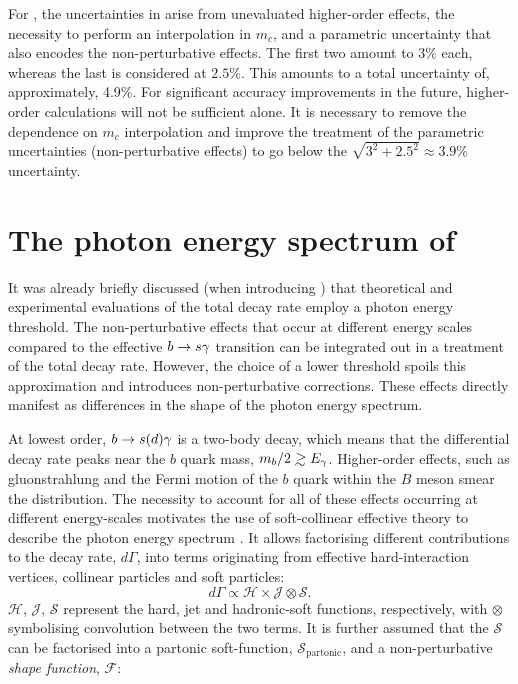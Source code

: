For \BtoXsgamma, the uncertainties in  arise from unevaluated higher-order effects, the necessity to perform an interpolation in $m_c$, and a parametric uncertainty that also encodes the non-perturbative effects.
The first two amount to $3\%$ each, whereas the last is considered at $2.5\%$. 
This amounts to a total uncertainty of, approximately, 4.9\%.
For significant accuracy improvements in the future, higher-order calculations will not be sufficient alone.
It is necessary to remove the dependence on $m_c$ interpolation and improve the treatment of the parametric uncertainties (non-perturbative effects) to go below the $\sqrt{3^2+2.5^2}\approx3.9\%$ uncertainty.

\section{The photon energy spectrum of \texorpdfstring{\BtoXsdgamma}{B->Xsg}}\label{sec:btosgamma_spectrum_theory}


It was already briefly discussed (when introducing ) that theoretical and experimental evaluations of the total \BtoXsgamma decay rate employ a photon energy threshold.
The non-perturbative effects that occur at different energy scales compared to the effective $b\rightarrow s\gamma$ transition can be integrated out in a treatment of the total decay rate.
However, the choice of a lower threshold spoils this approximation and introduces non-perturbative corrections.
These effects directly manifest as differences in the shape of the photon energy spectrum.

At lowest order, $b\rightarrow s(d) \gamma$ is a two-body decay, which means that the differential decay rate peaks near the $b$ quark mass, $m_b/2\gsim E_{\g}$.
Higher-order effects, such as gluonstrahlung and the Fermi motion of the $b$ quark within the $B$ meson smear the distribution.
The necessity to account for all of these effects occurring at different energy-scales motivates the use of soft-collinear effective theory to describe the \BtoXsgamma photon energy spectrum \cite{Neubert:2004qw,Ligeti:2008ac}.
It allows factorising different contributions to the decay rate, $d\Gamma$, into terms originating from effective hard-interaction vertices, collinear particles and soft particles:
\begin{equation}\label{eq:differential_decay_rate_SCET}
    d\Gamma \propto \mathcal{H} \times \mathcal{J} \otimes \mathcal{S}.
\end{equation}
$\mathcal{H}$, $\mathcal{J}$, $\mathcal{S}$ represent the hard, jet and hadronic-soft functions, respectively, with $\otimes$ symbolising convolution between the two terms.
It is further assumed that the $\mathcal{S}$ can be factorised into a partonic soft-function, $\mathcal{S}_{\mathrm{partonic}}$, and a non-perturbative \textit{shape function}, $\mathcal{F}$:

